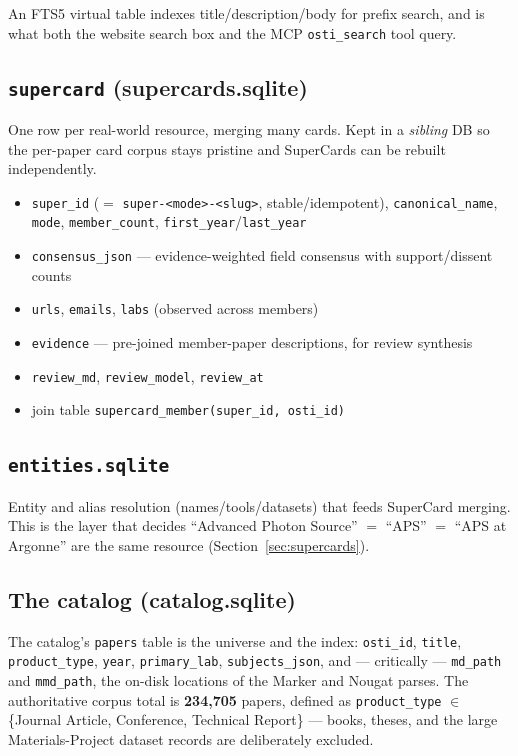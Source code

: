 \documentclass[11pt,letterpaper]{article}
\newcommand{\code}[1]{\texttt{\small #1}}
\begin{document}
An FTS5 virtual table indexes title/description/body for prefix search, and is what
both the website search box and the MCP \code{osti\_search} tool query.

\subsection{\code{supercard} (supercards.sqlite)}

One row per real-world resource, merging many cards. Kept in a \emph{sibling} DB so
the per-paper card corpus stays pristine and SuperCards can be rebuilt
independently.

\begin{itemize}[noitemsep,topsep=2pt]
\item \code{super\_id} ($=$ \code{super-<mode>-<slug>}, stable/idempotent),
  \code{canonical\_name}, \code{mode}, \code{member\_count},
  \code{first\_year}/\code{last\_year}
\item \code{consensus\_json} --- evidence-weighted field consensus with
  support/dissent counts
\item \code{urls}, \code{emails}, \code{labs} (observed across members)
\item \code{evidence} --- pre-joined member-paper descriptions, for review synthesis
\item \code{review\_md}, \code{review\_model}, \code{review\_at}
\item join table \code{supercard\_member(super\_id, osti\_id)}
\end{itemize}

\subsection{\code{entities.sqlite}}

Entity and alias resolution (names/tools/datasets) that feeds SuperCard merging.
This is the layer that decides ``Advanced Photon Source'' $=$ ``APS'' $=$ ``APS at
Argonne'' are the same resource (Section~\ref{sec:supercards}).

\subsection{The catalog (catalog.sqlite)}

The catalog's \code{papers} table is the universe and the index: \code{osti\_id},
\code{title}, \code{product\_type}, \code{year}, \code{primary\_lab},
\code{subjects\_json}, and --- critically --- \code{md\_path} and \code{mmd\_path},
the on-disk locations of the Marker and Nougat parses. The authoritative corpus
total is \textbf{234{,}705} papers, defined as \code{product\_type} $\in$
\{Journal Article, Conference, Technical Report\} --- books, theses, and the large
Materials-Project dataset records are deliberately excluded.
\end{document}
